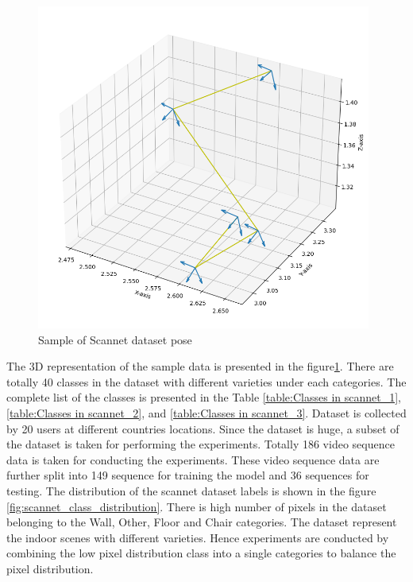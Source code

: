 	\begin{figure}[h]
		\centering
		\includegraphics[width=11cm]{images/pose_viz_scannet.png}
		\caption{Sample of Scannet dataset pose}
		\label{fig:sample_pose_scannet}
	\end{figure}
	
	The 3D representation of the sample data is presented in the figure\ref{fig:sample_pose_scannet}. There are totally 40 classes in the dataset with different varieties under each categories. The complete list of the classes is presented in the Table \ref{table:Classes in scannet_1}, \ref{table:Classes in scannet_2}, and \ref{table:Classes in scannet_3}. Dataset is collected by 20 users at different countries locations. Since the dataset is huge, a subset of the dataset is taken for performing the experiments. Totally 186 video sequence data is taken for conducting the experiments. These video sequence data are further split into 149 sequence for training the model and 36 sequences for testing. The distribution of the scannet dataset labels is shown in the figure \ref{fig:scannet_class_distribution}. There is high number of pixels in the dataset belonging to the Wall, Other, Floor and Chair categories. The dataset represent the indoor scenes with different varieties. Hence experiments are conducted by combining the low pixel distribution class into a single categories to balance the pixel distribution. 
	
